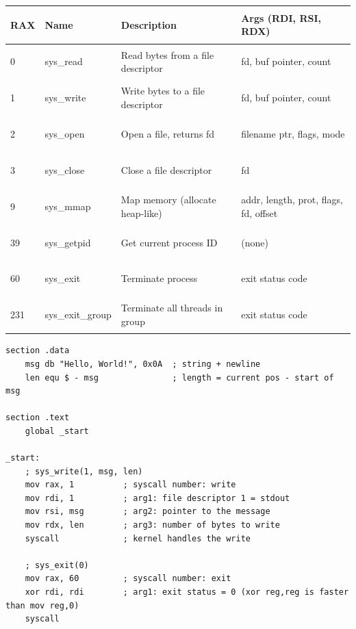 \documentclass[11pt, letterpaper]{article}
\begin{document}
\noindent
{\renewcommand{\arraystretch}{1.5}
\begin{tabularx}{\textwidth}{>{\centering\arraybackslash}p{1.5cm}
                              >{\ttfamily\bfseries\raggedright\arraybackslash}p{2.5cm}
                              >{\raggedright\arraybackslash}X
                              >{\raggedright\arraybackslash}p{3.5cm}}
\toprule
\rowcolor{tableheaderred}
\textbf{RAX} & \textbf{Name} & \textbf{Description} & \textbf{Args (RDI, RSI, RDX)} \\
\midrule
\rowcolor{rowRe} 0  & sys\_read   & Read bytes from a file descriptor & fd, buf pointer, count \\
\rowcolor{rowA}  1  & sys\_write  & Write bytes to a file descriptor  & fd, buf pointer, count \\
\rowcolor{rowRe} 2  & sys\_open   & Open a file, returns fd           & filename ptr, flags, mode \\
\rowcolor{rowA}  3  & sys\_close  & Close a file descriptor           & fd \\
\rowcolor{rowRe} 9  & sys\_mmap   & Map memory (allocate heap-like)   & addr, length, prot, flags, fd, offset \\
\rowcolor{rowA}  39 & sys\_getpid & Get current process ID            & (none) \\
\rowcolor{rowRe} 60 & sys\_exit   & Terminate process                 & exit status code \\
\rowcolor{rowA}  231 & sys\_exit\_group & Terminate all threads in group & exit status code \\
\bottomrule
\end{tabularx}}

\begin{lstlisting}[style=x86, caption={Hello World via direct syscall (no C library)}]
section .data
    msg db "Hello, World!", 0x0A  ; string + newline
    len equ $ - msg               ; length = current pos - start of msg

section .text
    global _start

_start:
    ; sys_write(1, msg, len)
    mov rax, 1          ; syscall number: write
    mov rdi, 1          ; arg1: file descriptor 1 = stdout
    mov rsi, msg        ; arg2: pointer to the message
    mov rdx, len        ; arg3: number of bytes to write
    syscall             ; kernel handles the write

    ; sys_exit(0)
    mov rax, 60         ; syscall number: exit
    xor rdi, rdi        ; arg1: exit status = 0 (xor reg,reg is faster than mov reg,0)
    syscall
\end{lstlisting}
\end{document}
